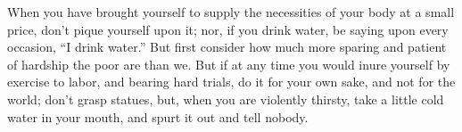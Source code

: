 When you  have brought  yourself to supply  the necessities of  your body  at a
small price, don't pique  yourself upon it; nor, if you  drink water, be saying
upon  every occasion,  ``I  drink water.''  But first  consider  how much  more
sparing and patient  of hardship the poor are  than we. But if at  any time you
would inure yourself by  exercise to labor, and bearing hard  trials, do it for
your own sake,  and not for the  world; don't grasp statues, but,  when you are
violently thirsty, take a little cold water in your mouth, and spurt it out and
tell nobody.
